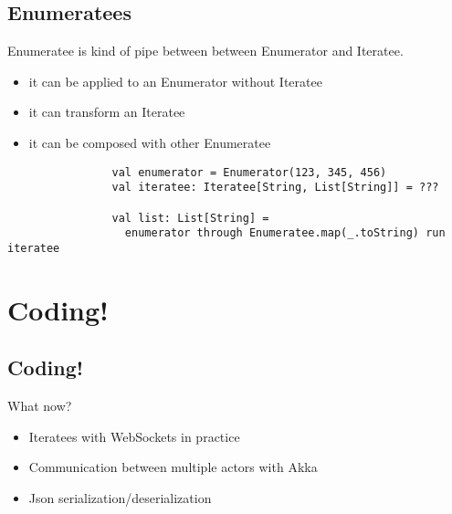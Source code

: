\documentclass{beamer}
\begin{document}
	\subsection{Enumeratees}
		\begin{frame}[fragile]
			Enumeratee is kind of pipe between between Enumerator and Iteratee.
			\begin{itemize}
				\pause \item it can be applied to an Enumerator without Iteratee
				\pause \item it can transform an Iteratee
				\pause \item it can be composed with other Enumeratee
			\end{itemize}

			\pause \begin{lstlisting}
				val enumerator = Enumerator(123, 345, 456)
				val iteratee: Iteratee[String, List[String]] = ???

				val list: List[String] =
				  enumerator through Enumeratee.map(_.toString) run iteratee
			\end{lstlisting}

		\end{frame}

\section{Coding!}
	\subsection{Coding!}
		\begin{frame}
			\begin{block}{What now?}
				\begin{itemize}
					\pause \item Iteratees with WebSockets in practice
					\pause \item Communication between multiple actors with Akka
					\pause \item Json serialization/deserialization
				\end{itemize}
			\end{block}
		\end{frame}
\end{document}
